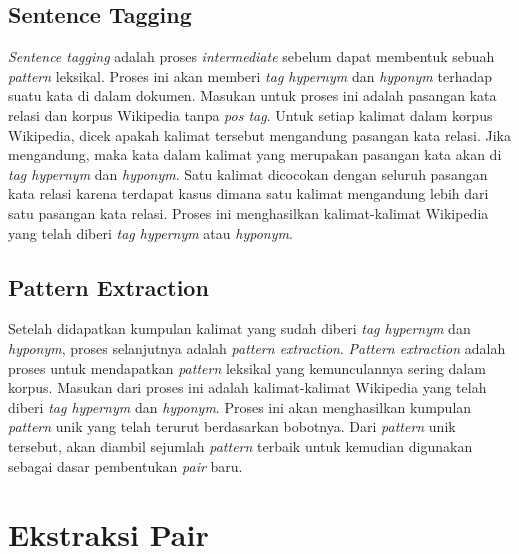 \subsection{Sentence Tagging}
\textit{Sentence tagging} adalah proses \textit{intermediate} sebelum dapat membentuk sebuah \textit{pattern} leksikal. Proses ini akan memberi \textit{tag hypernym} dan \textit{hyponym} terhadap suatu kata di dalam dokumen. Masukan untuk proses ini adalah pasangan kata relasi dan korpus Wikipedia tanpa \textit{pos tag}. Untuk setiap kalimat dalam korpus Wikipedia, dicek apakah kalimat tersebut mengandung pasangan kata relasi. Jika mengandung, maka kata dalam kalimat yang merupakan pasangan kata akan di \textit{tag hypernym} dan \textit{hyponym}. Satu kalimat dicocokan dengan seluruh pasangan kata relasi karena terdapat kasus dimana satu kalimat mengandung lebih dari satu pasangan kata relasi. Proses ini menghasilkan kalimat-kalimat Wikipedia yang telah diberi \textit{tag hypernym} atau \textit{hyponym}.

\subsection{Pattern Extraction}
Setelah didapatkan kumpulan kalimat yang sudah diberi \textit{tag hypernym} dan \textit{hyponym}, proses selanjutnya adalah \textit{pattern extraction}. \textit{Pattern extraction} adalah proses untuk mendapatkan \textit{pattern} leksikal yang kemunculannya sering dalam korpus. Masukan dari proses ini adalah kalimat-kalimat Wikipedia yang telah diberi \textit{tag hypernym} dan \textit{hyponym}. Proses ini akan menghasilkan kumpulan \textit{pattern} unik yang telah terurut berdasarkan bobotnya. Dari \textit{pattern} unik tersebut, akan diambil sejumlah \textit{pattern} terbaik untuk kemudian digunakan sebagai dasar pembentukan \textit{pair} baru.


\section{Ekstraksi Pair}




